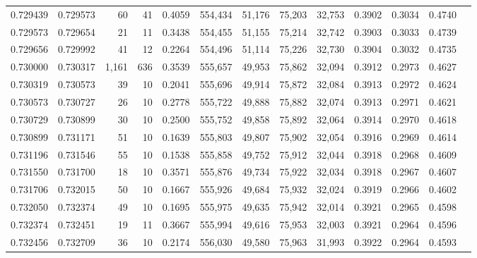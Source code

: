\begin{tabular}{rrrrrrrrrrrrr}
0.729439 & 0.729573 &    60 &  41 &                                     0.4059 & 554,434 &  51,176 &  75,203 &  32,753 & 0.3902 & 0.3034 & 0.4740 \\
0.729573 & 0.729654 &    21 &  11 &                                     0.3438 & 554,455 &  51,155 &  75,214 &  32,742 & 0.3903 & 0.3033 & 0.4739 \\
0.729656 & 0.729992 &    41 &  12 &                                     0.2264 & 554,496 &  51,114 &  75,226 &  32,730 & 0.3904 & 0.3032 & 0.4735 \\
0.730000 & 0.730317 & 1,161 & 636 &                                     0.3539 & 555,657 &  49,953 &  75,862 &  32,094 & 0.3912 & 0.2973 & 0.4627 \\
0.730319 & 0.730573 &    39 &  10 &                                     0.2041 & 555,696 &  49,914 &  75,872 &  32,084 & 0.3913 & 0.2972 & 0.4624 \\
0.730573 & 0.730727 &    26 &  10 &                                     0.2778 & 555,722 &  49,888 &  75,882 &  32,074 & 0.3913 & 0.2971 & 0.4621 \\
0.730729 & 0.730899 &    30 &  10 &                                     0.2500 & 555,752 &  49,858 &  75,892 &  32,064 & 0.3914 & 0.2970 & 0.4618 \\
0.730899 & 0.731171 &    51 &  10 &                                     0.1639 & 555,803 &  49,807 &  75,902 &  32,054 & 0.3916 & 0.2969 & 0.4614 \\
0.731196 & 0.731546 &    55 &  10 &                                     0.1538 & 555,858 &  49,752 &  75,912 &  32,044 & 0.3918 & 0.2968 & 0.4609 \\
0.731550 & 0.731700 &    18 &  10 &                                     0.3571 & 555,876 &  49,734 &  75,922 &  32,034 & 0.3918 & 0.2967 & 0.4607 \\
0.731706 & 0.732015 &    50 &  10 &                                     0.1667 & 555,926 &  49,684 &  75,932 &  32,024 & 0.3919 & 0.2966 & 0.4602 \\
0.732050 & 0.732374 &    49 &  10 &                                     0.1695 & 555,975 &  49,635 &  75,942 &  32,014 & 0.3921 & 0.2965 & 0.4598 \\
0.732374 & 0.732451 &    19 &  11 &                                     0.3667 & 555,994 &  49,616 &  75,953 &  32,003 & 0.3921 & 0.2964 & 0.4596 \\
0.732456 & 0.732709 &    36 &  10 &                                     0.2174 & 556,030 &  49,580 &  75,963 &  31,993 & 0.3922 & 0.2964 & 0.4593 \\

\end{tabular}
